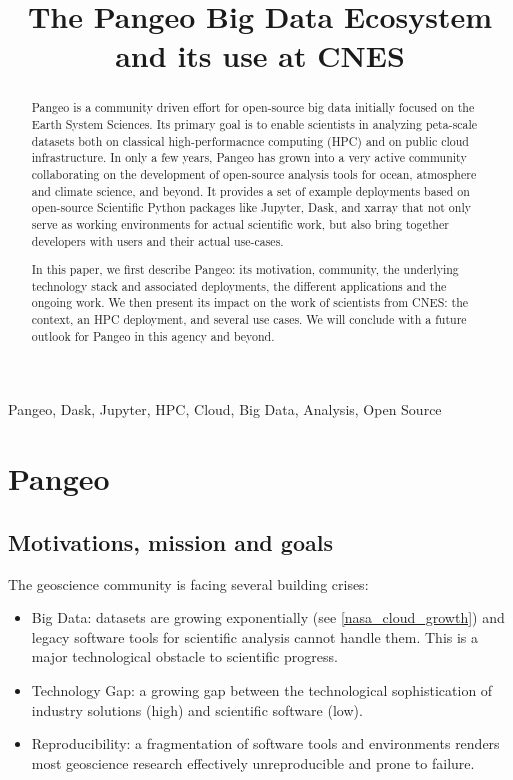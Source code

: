 \documentclass{article}
\title{The Pangeo Big Data Ecosystem and its use at CNES}
\begin{document}
%
\maketitle
%
\begin{abstract}
Pangeo\cite{b1} is a community driven effort for open-source big data initially
focused on the Earth System Sciences.  Its primary goal is to enable scientists
in analyzing peta-scale datasets both on classical high-performacnce computing
(HPC) and on public cloud infrastructure.  In only a few years, Pangeo has grown
into a very active community collaborating on the development of open-source
analysis tools for ocean, atmosphere and climate science, and beyond.  It
provides a set of example deployments based on open-source Scientific Python
packages like Jupyter\cite{Kluyver2016}, Dask\cite{Dask2016}, and
xarray\cite{Hoyer2017} that not only serve as working environments for actual
scientific work, but also bring together developers with users and their actual
use-cases.

In this paper, we first describe Pangeo: its motivation, community, the
underlying technology stack and associated deployments, the different
applications and the ongoing work. We then present its impact on the work of
scientists from CNES: the context, an HPC deployment, and several use cases.
We will conclude with a future outlook for Pangeo in this agency and beyond.
\end{abstract}
%
\begin{keywords}
Pangeo, Dask, Jupyter, HPC, Cloud, Big Data, Analysis, Open Source
\end{keywords}
%
\section{Pangeo}
\label{sec:pangeo}

\subsection{Motivations, mission and goals}
\label{ssec:motivations}

The geoscience community is facing several building crises:

\begin{itemize}
\item Big Data: datasets are growing exponentially (see \ref{nasa_cloud_growth}) and legacy software tools for scientific analysis cannot handle them. This is a major technological obstacle to scientific progress.
\item Technology Gap: a growing gap between the technological sophistication of industry solutions (high) and scientific software (low).
\item Reproducibility: a fragmentation of software tools and environments renders most geoscience research effectively unreproducible and prone to failure.
\end{itemize}
\end{document}
